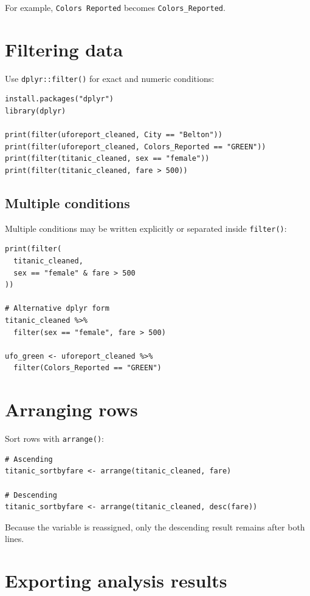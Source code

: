 For example, \texttt{Colors Reported} becomes \texttt{Colors\_Reported}.

\section{Filtering data}

Use \texttt{dplyr::filter()} for exact and numeric conditions:

\begin{lstlisting}[style=dsr]
install.packages("dplyr")
library(dplyr)

print(filter(uforeport_cleaned, City == "Belton"))
print(filter(uforeport_cleaned, Colors_Reported == "GREEN"))
print(filter(titanic_cleaned, sex == "female"))
print(filter(titanic_cleaned, fare > 500))
\end{lstlisting}

\subsection{Multiple conditions}

Multiple conditions may be written explicitly or separated inside \texttt{filter()}:

\begin{lstlisting}[style=dsr]
print(filter(
  titanic_cleaned,
  sex == "female" & fare > 500
))

# Alternative dplyr form
titanic_cleaned %>%
  filter(sex == "female", fare > 500)

ufo_green <- uforeport_cleaned %>%
  filter(Colors_Reported == "GREEN")
\end{lstlisting}

\section{Arranging rows}

Sort rows with \texttt{arrange()}:

\begin{lstlisting}[style=dsr]
# Ascending
titanic_sortbyfare <- arrange(titanic_cleaned, fare)

# Descending
titanic_sortbyfare <- arrange(titanic_cleaned, desc(fare))
\end{lstlisting}

Because the variable is reassigned, only the descending result remains after both lines.

\section{Exporting analysis results}

